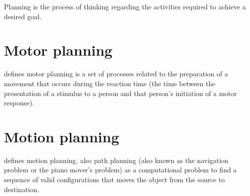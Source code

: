 \documentclass[a4paper]{article}
\begin{document}
      Planning is the process of thinking regarding the activities required to achieve a desired goal. 


   \section{Motor planning}
       defines motor planning is a set of processes related to the preparation of a movement that occurs during the reaction time (the time between the presentation of a stimulus to a person and that person's initiation of a motor response).


   \section{Motion planning}
       defines motion planning, also path planning (also known as the navigation problem or the piano mover's problem) as a computational problem to find a sequence of valid configurations that moves the object from the source to destination.


      
      
\end{document}
